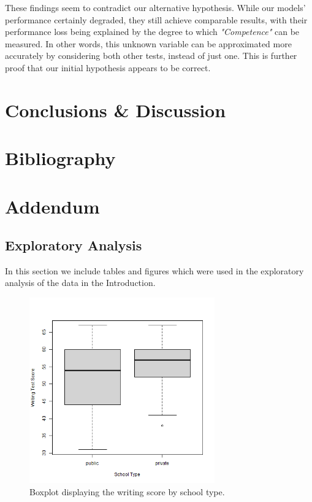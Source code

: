 \documentclass[10pt]{article}
\begin{document}
	These findings seem to contradict our alternative hypothesis. While our models' performance certainly degraded, they still achieve comparable results, with their performance loss being explained by the degree to which \textit{"Competence"} can be measured. In other words, this unknown variable can be approximated more accurately by considering both other tests, instead of just one. This is further proof that our initial hypothesis appears to be correct.
	
	
	

	
	\section{Conclusions \& Discussion}
	\label{sec::conclusions}
	\lipsum[23-28]
	
	\section{Bibliography}
	\printbibliography
	
	\section{Addendum}
	\label{sec::addendum}
	
	\subsection{Exploratory Analysis}
	In this section we include tables and figures which were used in the exploratory analysis of the data in the Introduction. 
	
	\begin{figure}
		\includegraphics[width=8cm]{write_schtyp_boxplot.png}
		\centering
		\caption{Boxplot displaying the writing score by school type.}
		\label{fig::write_schtyp_boxplot}
	\end{figure}
	
\end{document}
